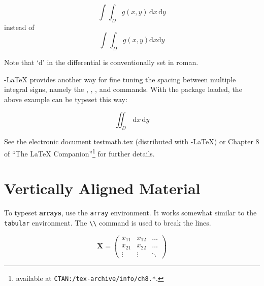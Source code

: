 \begin{singlespace}
\begin{example}
\newcommand{\rd}{\mathrm{d}}
\begin{displaymath}
\int\!\!\!\int_{D} g(x,y)
  \, \rd x\, \rd y 
\end{displaymath}
instead of 
\begin{displaymath}
\int\int_{D} g(x,y)\rd x \rd y
\end{displaymath}
\end{example}
\end{singlespace}
Note that `d' in the differential is conventionally set in roman.

\AmS-\LaTeX{} provides another way for fine tuning
the spacing between multiple integral signs,
namely the , , , and  commands.
With the  package loaded, the above example can be
typeset this way:

\begin{singlespace}
\begin{example}
\newcommand{\rd}{\mathrm{d}}
\begin{displaymath}
\iint_{D} \, \rd x \, \rd y
\end{displaymath}
\end{example}
\end{singlespace}

See the electronic document testmath.tex (distributed with
\AmS-\LaTeX) or Chapter 8 of ``The LaTeX Companion''\footnote{
available at \texttt{CTAN:/tex-archive/info/ch8.*}.} for further details.

\section{Vertically Aligned Material}
\label{sec:vert}

To typeset \textbf{arrays}, use the \texttt{array} environment. It works
somewhat similar to the \texttt{tabular} environment. The \verb|\\| command is
used to break the lines.

\begin{singlespace}
\begin{example}
\begin{displaymath}
\mathbf{X} =
\left( \begin{array}{ccc}
x_{11} & x_{12} & \ldots \\
x_{21} & x_{22} & \ldots \\
\vdots & \vdots & \ddots
\end{array} \right)
\end{displaymath}
\end{example}
\end{singlespace}

